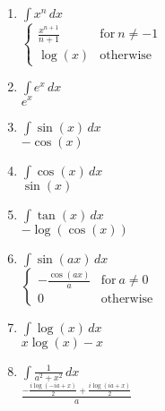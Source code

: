 \begin{enumerate}
\item $\int x^{n}\, dx$\\ 
 $\begin{cases} \frac{x^{n + 1}}{n + 1} & \text{for}\: n \neq -1 \\\log{\left(x \right)} & \text{otherwise} \end{cases}$
\item $\int e^{x}\, dx$\\ 
 $e^{x}$
\item $\int \sin{\left(x \right)}\, dx$\\ 
 $- \cos{\left(x \right)}$
\item $\int \cos{\left(x \right)}\, dx$\\ 
 $\sin{\left(x \right)}$
\item $\int \tan{\left(x \right)}\, dx$\\ 
 $- \log{\left(\cos{\left(x \right)} \right)}$
\item $\int \sin{\left(a x \right)}\, dx$\\ 
 $\begin{cases} - \frac{\cos{\left(a x \right)}}{a} & \text{for}\: a \neq 0 \\0 & \text{otherwise} \end{cases}$
\item $\int \log{\left(x \right)}\, dx$\\ 
 $x \log{\left(x \right)} - x$
\item $\int \frac{1}{a^{2} + x^{2}}\, dx$\\ 
 $\frac{- \frac{i \log{\left(- i a + x \right)}}{2} + \frac{i \log{\left(i a + x \right)}}{2}}{a}$
\end{enumerate}
